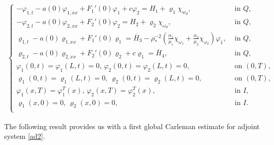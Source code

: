 \documentclass[11pt,a4paper]{amsart}
\numberwithin{equation}{section}
\begin{document}
    \begin{align} \label{ad2}
		\begin{cases}
			-\varphi_{1,t}-a(0)\varphi_{1,xx}+F_1'(0)\varphi_1+c\varphi_2   =H_1+ \varrho_1\chi_{w_{d}},&\text{ in } Q,\\
			-\varphi_{2,t}-a(0)\varphi_{2,xx}+F_2'(0)\varphi_2  = H_2+ \varrho_2\chi_{\omega_{d}},&\text{ in } Q,\\
			\varrho_{1,t}-a(0)\varrho_{1,xx} + F_1'(0)\varrho_1   =\overline{H}_3 -\rho_*^{-2}(\frac{\alpha_1}{\mu_1}\chi_{\omega_1}+\frac{\alpha_2}{\mu_2}\chi_{\omega_2})\varphi_{1}, &\text{ in } Q,\\ 
			\varrho_{2,t}-a(0)\varrho_{2,xx}+F_2'(0)\varrho_2+ c\varrho_1 = \overline{H}_4, &\text{ in } Q,\\ 	 
			\varphi_1(0,t) = \varphi_1(L,t) =0,\,  \varphi_2(0,t) = \varphi_2(L,t) = 0, &\text{ on } (0,T),\\
			\varrho_1(0,t) = \varrho_1(L,t) =0,\,  \varrho_2(0,t) = \varrho_2(L,t) = 0, &\text{ on } (0,T),\\
			\varphi_1(x,T) =\varphi_1^T(x), \, \varphi_2(x,T) =\varphi_2^T(x),&\text{ in } I,\\
			\varrho_1(x,0) = 0, \,\varrho_2(x,0) = 0, &\text{ in } I.\\
		\end{cases}		
	\end{align}


The following result provides us with a first global Carleman estimate for adjoint system \eqref{ad2}.
\end{document}
